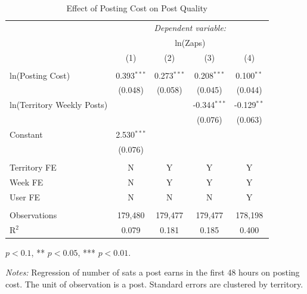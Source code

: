\begin{table}[H]
\centering
\caption{Effect of Posting Cost on Post Quality} 
\vspace{0.2cm}
\label{tbl_sats48_cost_reg}
\begin{threeparttable}
\begin{tabular}{lcccc} 
\toprule
 & \multicolumn{4}{c}{\textit{Dependent variable:}} \\ 
 & \multicolumn{4}{c}{ln(Zaps)} \\ [1ex]
 & (1) & (2) & (3) & (4)\\ 
\midrule
 &  &  &  &  \\
ln(Posting Cost)  & 0.393$^{***}$ & 0.273$^{***}$ & 0.208$^{***}$ & 0.100$^{**}$ \\
 & (0.048) & (0.058) & (0.045) & (0.044) \\ [1ex] 
ln(Territory Weekly Posts)  &  &  & -0.344$^{***}$ & -0.129$^{**}$ \\
 &  &  & (0.076) & (0.063) \\ [1ex] 
Constant  & 2.530$^{***}$ &  &  &  \\
 & (0.076) &  &  &  \\ [1ex] 
 & & & & \\
Territory FE            & N & Y & Y & Y \\
Week FE                 & N & Y & Y & Y \\
User FE                 & N & N & N & Y \\
& & & & \\
Observations  & 179,480 & 179,477 & 179,477 & 178,198 \\
R$^2$  & 0.079 & 0.181 & 0.185 & 0.400 \\ [1.8ex] 
\bottomrule
\end{tabular} 
\begin{tablenotes}[flushleft]
\footnotesize
\item[] \parbox[t]{\linewidth}{%
\hfill * $p<0.1$, ** $p<0.05$, *** $p<0.01$.
}
\item \textit{Notes:} Regression of number of sats a post earns in the first 48 hours on posting cost. The unit of observation is a post. Standard errors are clustered by territory.
\end{tablenotes}
\end{threeparttable}
\end{table}

